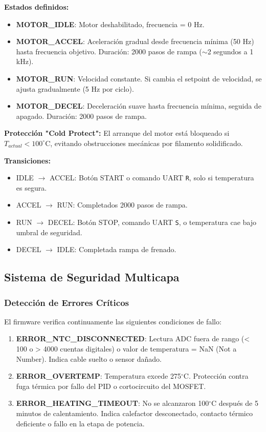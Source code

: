 \documentclass[12pt]{article}
\begin{document}
\textbf{Estados definidos:}
\begin{itemize}
    \item \textbf{MOTOR\_IDLE}: Motor deshabilitado, frecuencia = 0 Hz.
    \item \textbf{MOTOR\_ACCEL}: Aceleración gradual desde frecuencia mínima (50 Hz) hasta frecuencia objetivo. Duración: 2000 pasos de rampa ($\sim$2 segundos a 1 kHz).
    \item \textbf{MOTOR\_RUN}: Velocidad constante. Si cambia el setpoint de velocidad, se ajusta gradualmente (5 Hz por ciclo).
    \item \textbf{MOTOR\_DECEL}: Deceleración suave hasta frecuencia mínima, seguida de apagado. Duración: 2000 pasos de rampa.
\end{itemize}

\textbf{Protección "Cold Protect":} El arranque del motor está bloqueado si $T_{actual} < 100^{\circ}$C, evitando obstrucciones mecánicas por filamento solidificado.

\textbf{Transiciones:}
\begin{itemize}
    \item IDLE $\rightarrow$ ACCEL: Botón START o comando UART \texttt{R}, solo si temperatura es segura.
    \item ACCEL $\rightarrow$ RUN: Completados 2000 pasos de rampa.
    \item RUN $\rightarrow$ DECEL: Botón STOP, comando UART \texttt{S}, o temperatura cae bajo umbral de seguridad.
    \item DECEL $\rightarrow$ IDLE: Completada rampa de frenado.
\end{itemize}

\subsection{Sistema de Seguridad Multicapa}

\subsubsection{Detección de Errores Críticos}
El firmware verifica continuamente las siguientes condiciones de fallo:

\begin{enumerate}
    \item \textbf{ERROR\_NTC\_DISCONNECTED}: Lectura ADC fuera de rango (< 100 o > 4000 cuentas digitales) o valor de temperatura = NaN (Not a Number). Indica cable suelto o sensor dañado.
    \item \textbf{ERROR\_OVERTEMP}: Temperatura excede 275$^{\circ}$C. Protección contra fuga térmica por fallo del PID o cortocircuito del MOSFET.
    \item \textbf{ERROR\_HEATING\_TIMEOUT}: No se alcanzaron 100$^{\circ}$C después de 5 minutos de calentamiento. Indica calefactor desconectado, contacto térmico deficiente o fallo en la etapa de potencia.
\end{enumerate}
\end{document}
